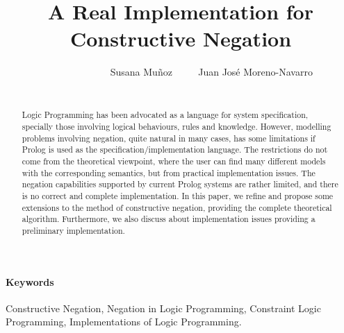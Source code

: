 \documentclass{llncs}
\begin{document}

\title{A Real Implementation for \\
       Constructive Negation}

\author{~~~~~~~~~~~~ Susana Mu\~{n}oz ~~~~ Juan Jos\'{e} Moreno-Navarro \\
 ~~~~~ }


\maketitle

\vspace{-12pt}

%



\begin{abstract}
  Logic Programming has been advocated as a language for system
  specification, specially those involving logical behaviours, rules
  and knowledge. However, modelling problems involving negation, quite
  natural in many cases, has some limitations if Prolog is used as the
  specification/implementation language. The restrictions do not come
  from the theoretical viewpoint, where the user can find many
  different models with the corresponding semantics, but from
  practical implementation issues.  The negation capabilities
  supported by current Prolog systems are rather limited, and there is
  no correct and complete implementation.  In this paper, we refine
  and propose some extensions to the method of constructive negation,
  providing the complete theoretical algorithm. Furthermore, we also
  discuss about implementation issues providing a preliminary
  implementation.
\end{abstract}

\paragraph{\bf Keywords}
Constructive Negation, Negation in Logic Programming, Constraint Logic
Programming, Implementations of Logic Programming.
\end{document}
